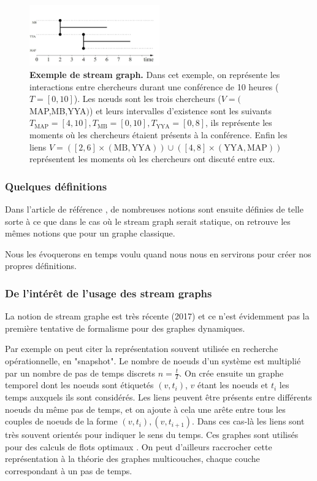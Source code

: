 \documentclass[11pt,a4paper]{article}
\theoremstyle{definition}
\theoremstyle{remark}
\theoremstyle{remark}
\begin{document}
\begin{figure}[H]
\centering
\includegraphics[width=0.5\textwidth]{exStreamGraph.JPG}
\caption{\textbf{Exemple de stream graph.} Dans cet exemple, on représente les interactions entre chercheurs durant une conférence de 10 heures ($T=[0,10]$). Les nœuds sont les trois chercheurs ($V=($MAP,MB,YYA$)$) et leurs intervalles d'existence sont les suivants $T_{\text{MAP}}=[4,10], T_{\text{MB}}=[0,10], T_{\text{YYA}}=[0,8]$, ils représente les moments où les chercheurs étaient présents à la conférence. Enfin les liens $V=([2,6]\times (\text{MB},\text{YYA})) \cup ([4,8]\times(\text{YYA},\text{MAP}))$ représentent les moments où les chercheurs ont discuté entre eux.}
\end{figure}




\subsubsection{Quelques définitions}

Dans l'article de référence \cite{stream}, de nombreuses notions sont ensuite définies de telle sorte à ce que dans le cas où le stream graph serait statique, on retrouve les mêmes notions que pour un graphe classique.

Nous les évoquerons en temps voulu quand nous nous en servirons pour créer nos propres définitions.

\subsubsection{De l'intérêt de l'usage des stream graphs}
La notion de stream graphe est très récente (2017)\cite{stream} et ce n'est évidemment pas la première tentative de formalisme pour des graphes dynamiques.

Par exemple on peut citer la représentation souvent utilisée en recherche opérationnelle, en "snapshot". Le nombre de noeuds d'un système est multiplié par un nombre de pas de temps discrets $n=\frac{t}{T}$. On crée ensuite un graphe temporel dont les noeuds sont étiquetés $(v,t_i)$, $v$ étant les noeuds et $t_i$ les temps auxquels ils sont considérés. Les liens peuvent être présents entre différents noeuds du même pas de temps, et on ajoute à cela une arête entre tous les couples de noeuds de la forme $(v,t_i),(v,t_{i+1})$. 
Dans ces cas-là les liens sont très souvent orientés pour indiquer le sens du temps. Ces graphes sont utilisés pour des calculs de flots optimaux \cite{map}. On peut d'ailleurs raccrocher cette représentation à la théorie des graphes multicouches, chaque couche correspondant à un pas de temps.
\end{document}
